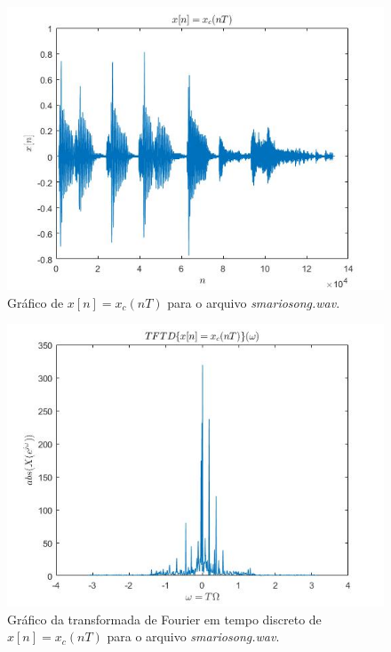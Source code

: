 \documentclass[a4paper, 12pt]{article}
\begin{document}
\begin{figure}[H]
	\centering
	\includegraphics[scale=0.7]{img3.jpg} 
	\caption{Gráfico de $x[n]=x_c(nT)$ para o arquivo \textit{smariosong.wav}.}
	\label{fig:3}
\end{figure}

\begin{figure}[H]
	\centering
	\includegraphics[scale=0.7]{img4.jpg} 
	\caption{Gráfico da transformada de Fourier em tempo discreto de  $x[n]=x_c(nT)$ para o arquivo \textit{smariosong.wav}.}
	\label{fig:4}
\end{figure}
\end{document}
